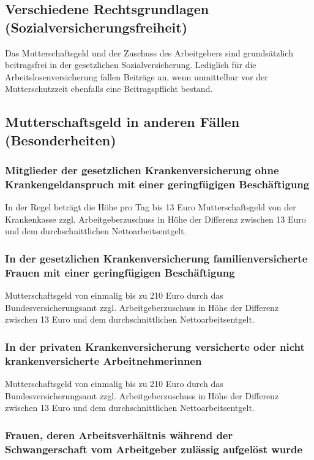 \documentclass[a4paper, 12pt]{report}
\begin{document}
\subsection{Verschiedene Rechtsgrundlagen (Sozialversicherungsfreiheit)}

Das Mutterschaftsgeld und der Zuschuss des Arbeitgebers sind grundsätzlich
beitragsfrei in der gesetzlichen  Sozialversicherung. Lediglich für die
Arbeitslosenversicherung fallen Beiträge an, wenn unmittelbar vor der
Mutterschutzzeit ebenfalls eine Beitragspflicht bestand.

\subsection{Mutterschaftsgeld in anderen Fällen (Besonderheiten)}

\subsubsection{Mitglieder der gesetzlichen Krankenversicherung ohne
Krankengeldanspruch mit  einer geringfügigen Beschäftigung}

In der Regel beträgt die Höhe pro Tag bis 13 Euro Mutterschaftsgeld von der
Krankenkasse zzgl. Arbeitgeberzuschuss in Höhe der Differenz zwischen 13 Euro
und dem durchschnittlichen Nettoarbeitsentgelt.

\subsubsection{In der gesetzlichen Krankenversicherung familienversicherte
Frauen mit einer geringfügigen Beschäftigung}

Mutterschaftsgeld von einmalig bis zu 210 Euro durch das Bundesversicherungsamt
zzgl. Arbeitgeberzuschuss in Höhe der Differenz zwischen 13 Euro und dem
durchschnittlichen Nettoarbeitsentgelt.

\subsubsection{In der privaten Krankenversicherung versicherte oder nicht
krankenversicherte Arbeitnehmerinnen}

Mutterschaftsgeld von einmalig bis zu 210 Euro durch das Bundesversicherungsamt
zzgl. Arbeitgeberzuschuss in Höhe der Differenz zwischen 13 Euro und dem
durchschnittlichen Nettoarbeitsentgelt.

\subsubsection{Frauen, deren Arbeitsverhältnis während der Schwangerschaft vom
Arbeitgeber zulässig aufgelöst wurde}
\end{document}
